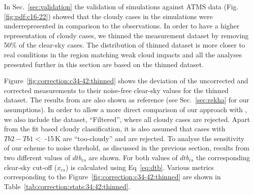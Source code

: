 \documentclass[12pt]{article}
\begin{document}
In Sec.~\ref{sec:validation} the validation of simulations against ATMS data
(Fig.\ref{fig:pdf:c16-22}) showed that the cloudy cases in the simulations were
underrepresented in comparison to the observations. In order to have a higher
representation of cloudy cases, we thinned the measurement dataset by removing
50\% of the clear-sky cases. The distribution of thinned dataset is more closer
to real conditions in the region matching weak cloud impacts and all the
analyses presented further in this section are based on the thinned dataset.

Figure~\ref{fig:correction:c34-42:thinned} shows the deviation of the uncorrected and
corrected measurements to their noise-free clear-sky values for the thinned dataset. The results from
\cite{rekha2012potential} are also shown as reference (see Sec.~\ref{sec:rekha}
for our assumptions). In order to allow a more direct comparison of our
approach with \cite{rekha2012potential}, we also include the
dataset, ``Filtered'', where all cloudy cases are rejected. Apart from the fit
based cloudy classification, it is also assumed that cases with $Tb2-Tb1 < $
-15\,K are ``too-cloudy'' and are rejected.  To analyse the sensitivity of our scheme to noise threhold, as discussed in the previous section, results from two different values of $dtb_{cs}$ are shown. For both values of $dtb_{cs}$ the corresponding clear-sky cut-off
($x_{cs}$) is calculated using Eq~\ref{eq:dtb}. Various metrics corresponding to
the Figure~\ref{fig:correction:c34-42:thinned} are shown in
Table~\ref{tab:correction:stats:34:42:thinned}.
\end{document}

